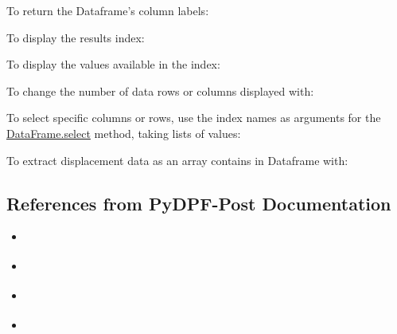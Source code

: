 \documentclass[9pt,landscape]{article}
\begin{document}
\begin{multicols}{3}

To return the Dataframe's column labels:


To display the results index:


To display the values available in the index:


To change the number of data rows or columns displayed with:


To select specific columns or rows, use the index names as arguments for the \underline{DataFrame.select} method, taking lists of values:


To extract displacement data as an array contains in Dataframe with:



\subsection{References from PyDPF-Post Documentation}
\begin{multicols}{2}
\begin{itemize}
    \item \href{https://post.docs.pyansys.com/version/stable/getting_started/index.html}{\color{blue}{Getting Started}}
    \item \href{https://post.docs.pyansys.com/version/stable/user_guide/index.html}{\color{blue}{User Guide}}
    \item \href{https://post.docs.pyansys.com/version/stable/examples/index.html}{\color{blue}{Examples}}
    \item \href{https://post.docs.pyansys.com/version/stable/api/index.html}{\color{blue}{API Reference}}
\end{itemize}
\end{multicols}
\end{multicols}
\end{document}
